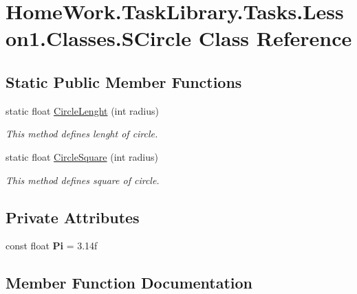 \hypertarget{class_home_work_1_1_task_library_1_1_tasks_1_1_lesson1_1_1_classes_1_1_s_circle}{}\section{Home\+Work.\+Task\+Library.\+Tasks.\+Lesson1.\+Classes.\+S\+Circle Class Reference}
\label{class_home_work_1_1_task_library_1_1_tasks_1_1_lesson1_1_1_classes_1_1_s_circle}
\subsection*{Static Public Member Functions}
\begin{DoxyCompactItemize}
\item 
static float \mbox{\hyperlink{class_home_work_1_1_task_library_1_1_tasks_1_1_lesson1_1_1_classes_1_1_s_circle_aecb260b1e8cbd1538673bf0a393b9f5c}{Circle\+Lenght}} (int radius)
\begin{DoxyCompactList}\small\item\em This method defines lenght of circle. \end{DoxyCompactList}\item 
static float \mbox{\hyperlink{class_home_work_1_1_task_library_1_1_tasks_1_1_lesson1_1_1_classes_1_1_s_circle_a6845fb0f75930aaf1afe2768a0748ba1}{Circle\+Square}} (int radius)
\begin{DoxyCompactList}\small\item\em This method defines square of circle. \end{DoxyCompactList}\end{DoxyCompactItemize}
\subsection*{Private Attributes}
\begin{DoxyCompactItemize}
\item 
\mbox{\label{class_home_work_1_1_task_library_1_1_tasks_1_1_lesson1_1_1_classes_1_1_s_circle_a59cbda12721ad4547304567fb2a1438f}} 
const float {\bfseries Pi} = 3.\+14f
\end{DoxyCompactItemize}


\subsection{Member Function Documentation}
\mbox{\label{class_home_work_1_1_task_library_1_1_tasks_1_1_lesson1_1_1_classes_1_1_s_circle_aecb260b1e8cbd1538673bf0a393b9f5c}} 
